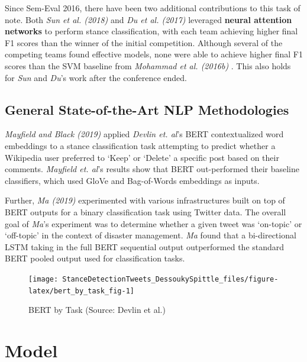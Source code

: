\documentclass[]{article}
\begin{document}
Since Sem-Eval 2016, there have been two additional contributions to
this task of note. Both \emph{Sun et al. (2018) } and \emph{Du et al.
(2017) } leveraged \textbf{neural attention networks} to perform stance
classification, with each team achieving higher final F1 scores than the
winner of the initial competition. Although several of the competing
teams found effective models, none were able to achieve higher final F1
scores than the SVM baseline from \emph{Mohammad et al. (2016b) }. This
also holds for \emph{Sun} and \emph{Du}'s work after the conference
ended.

\hypertarget{general-state-of-the-art-nlp-methodologies}{%
\subsection{General State-of-the-Art NLP
Methodologies}\label{general-state-of-the-art-nlp-methodologies}}

\emph{Mayfield and Black (2019) } applied \emph{Devlin et. al}'s BERT
contextualized word embeddings to a stance classification task
attempting to predict whether a Wikipedia user preferred to `Keep' or
`Delete' a specific post based on their comments. \emph{Mayfield et.
al}'s results show that BERT out-performed their baseline classifiers,
which used GloVe and Bag-of-Words embeddings as inputs.

Further, \emph{Ma (2019) } experimented with various infrastructures
built on top of BERT outputs for a binary classification task using
Twitter data. The overall goal of \emph{Ma}'s experiment was to
determine whether a given tweet was `on-topic' or `off-topic' in the
context of disaster management. \emph{Ma} found that a bi-directional
LSTM taking in the full BERT sequential output outperformed the standard
BERT pooled output used for classification tasks.

\begin{figure}

{\centering \texttt{[image: StanceDetectionTweets\_DessoukySpittle\_files/figure-latex/bert\_by\_task\_fig-1]} 

}

\caption{\label{fig:bert_by_task}BERT by Task (Source: Devlin et al.)}\label{fig:bert_by_task_fig}
\end{figure}

\hypertarget{model}{%
\section{Model}\label{model}}
\end{document}
